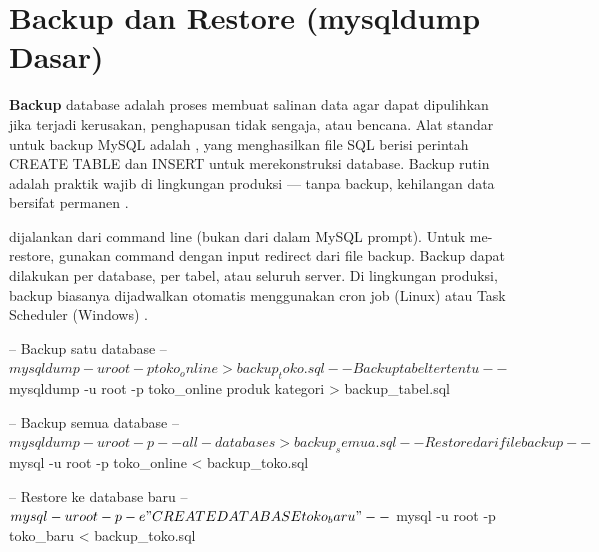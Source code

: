 \section{Backup dan Restore (mysqldump Dasar)}

\textbf{Backup} database adalah proses membuat salinan data agar dapat dipulihkan jika terjadi kerusakan, penghapusan tidak sengaja, atau bencana. Alat standar untuk backup MySQL adalah , yang menghasilkan file SQL berisi perintah CREATE TABLE dan INSERT untuk merekonstruksi database. Backup rutin adalah praktik wajib di lingkungan produksi --- tanpa backup, kehilangan data bersifat permanen \cite{mysqlDocs}.

 dijalankan dari command line (bukan dari dalam MySQL prompt). Untuk me-restore, gunakan command  dengan input redirect dari file backup. Backup dapat dilakukan per database, per tabel, atau seluruh server. Di lingkungan produksi, backup biasanya dijadwalkan otomatis menggunakan cron job (Linux) atau Task Scheduler (Windows) \cite{mysqlGettingStarted}.

\begin{webcode}[language=SQL, caption={Backup dan restore dengan mysqldump (dijalankan di terminal)}]
-- Backup satu database
-- $ mysqldump -u root -p toko_online > backup_toko.sql

-- Backup tabel tertentu
-- $ mysqldump -u root -p toko_online produk kategori > backup_tabel.sql

-- Backup semua database
-- $ mysqldump -u root -p --all-databases > backup_semua.sql

-- Restore dari file backup
-- $ mysql -u root -p toko_online < backup_toko.sql

-- Restore ke database baru
-- $ mysql -u root -p -e "CREATE DATABASE toko_baru"
-- $ mysql -u root -p toko_baru < backup_toko.sql
\end{webcode}

